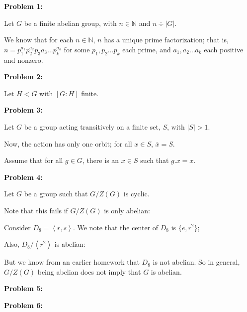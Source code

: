 \documentclass[a4paper,12pt]{article}
\newcommand{\tab}{\hspace{4mm}} %
\newcommand{\shunt}{\vspace{20mm}}
\newcommand{\absval}[1]{\lvert #1 \rvert}
\newcommand{\anbrack}[1]{\left\langle #1 \right\rangle}
\newcommand{\N}{\mathbb{N}}
\begin{document}
{\bf Problem 1:}

Let $G$ be a finite abelian group, with $n \in \N$ and $n \div \absval{G}$.

We know that for each $n \in \N$, $n$ has a unique prime factorization; that is, $n=p_1^{a_1}p_2^{a_2}p_3{a_3}\ldots p_k^{a_k}$ for some $p_1, p_2 \ldots p_k$ each prime, and $a_1, a_2 \ldots a_k$ each positive and nonzero.


\shunt

{\bf Problem 2:}

Let $H < G$ with $[G:H]$ finite.


\shunt

{\bf Problem 3:}

Let $G$ be a group acting transitively on a finite set, $S$, with $\absval{S} > 1$.

Now, the action has only one orbit; for all $x \in S$, $\overline{x} = S$.

Assume that for all $g \in G$, there is an $x \in S$ such that $g.x=x$.


\shunt

{\bf Problem 4:}

Let $G$ be a group such that $G/Z(G)$ is cyclic.


Note that this fails if $G/Z(G)$ is only abelian:

\tab Consider $D_8=\anbrack{r,s}$. We note that the center of $D_8$ is $\{e,r^2\}$;

\tab \tab %

\tab Also, $D_8/\anbrack{r^2}$ is abelian:

\tab \tab %

\tab But we know from an earlier homework that $D_8$ is not abelian. So in general, $G/Z(G)$ being abelian does not imply that $G$ is abelian.

\shunt

{\bf Problem 5:}

\shunt

{\bf Problem 6:}

\shunt
\end{document}

